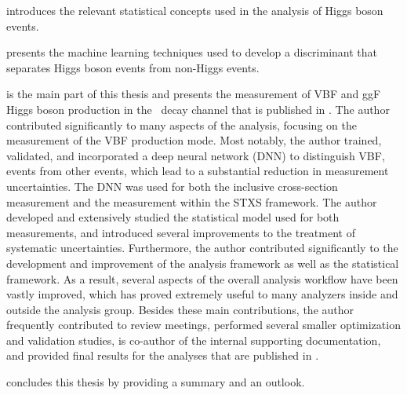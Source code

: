  introduces the relevant statistical concepts used in the analysis of Higgs boson events.

 presents the machine learning techniques used to develop a discriminant that separates Higgs boson events from non-Higgs events.

 is the main part of this thesis and presents the measurement of VBF and ggF Higgs boson production in the \HWW\ decay channel that is published in . The author contributed significantly to many aspects of the analysis, focusing on the measurement of the VBF production mode. 
Most notably, the author trained, validated, and incorporated a deep neural network (DNN) to distinguish VBF, \HWW events from other events, which lead to a substantial reduction in measurement uncertainties.
The DNN was used for both the inclusive cross-section measurement and the measurement within the STXS framework.
The author developed and extensively studied the statistical model used for both measurements, and introduced several improvements to the treatment of systematic uncertainties.
Furthermore, the author contributed significantly to the development and improvement of the analysis framework as well as the statistical framework. As a result, several aspects of the overall analysis workflow have been vastly improved, which has proved extremely useful to many analyzers inside and outside the \HWW analysis group.
Besides these main contributions, the author frequently contributed to review meetings, performed several smaller optimization and validation studies, is co-author of the internal supporting documentation, and provided final results for the analyses that are published in .

 concludes this thesis by providing a summary and an outlook.


